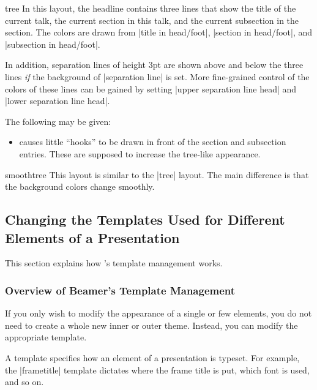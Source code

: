 \begin{outerthemeexample}{tree}
  In this layout, the headline contains three lines that show the
  title of the current talk, the current section in this talk, and the
  current subsection in the section. The colors are drawn from
  |title in head/foot|, |section in head/foot|, and
  |subsection in head/foot|.

  In addition, separation lines of height 3pt are shown above and
  below the three lines \emph{if} the background of |separation line|
  is set. More fine-grained control of the colors of these lines can
  be gained by setting |upper separation line head| and
  |lower separation line head|.

  The following  may be given:
  \begin{itemize}
  \item
     causes little ``hooks'' to be drawn in front of
    the section and subsection entries. These are supposed to increase
    the tree-like appearance.
  \end{itemize}
\end{outerthemeexample}

\begin{outerthemeexample}{smoothtree}
  This layout is similar to the |tree| layout. The main difference is
  that the background colors change smoothly.
\end{outerthemeexample}





\subsection{Changing the Templates Used for Different Elements of a Presentation}

\label{section-templates}

This section explains how \beamer's template management works.



\subsubsection{Overview of Beamer's Template Management}

If you only wish to modify the appearance of a single or few elements,
you do not need to create a whole new inner or outer theme. Instead,
you can modify the appropriate template.

A template specifies how an element of a presentation is typeset. For
example, the |frametitle| template dictates where the frame title is
put, which font is used, and so on.

